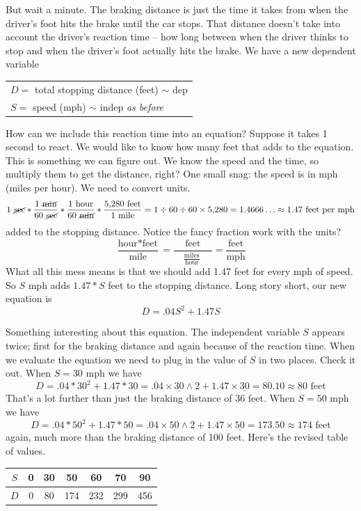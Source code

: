 But wait a minute.  The braking distance is just the time it takes from when the driver's foot hits the brake until the car stops.  That distance doesn't take into account the driver's reaction time -- how long between when the driver thinks to stop and when the driver's foot actually hits the brake.  We have a new dependent variable
\begin{center}
\begin{tabular} {l} 
$D=$ total stopping distance (feet) $\sim$ dep \\ 
$S=$ speed (mph) $\sim$ indep \quad \emph{as before}\\
\end{tabular}
\end{center}

How can we include this reaction time into an equation?  Suppose it takes 1 second to react.  We would like to know how many feet that adds to the equation.  This is something we can figure out.  We know the speed and the time, so multiply them to get the distance, right?  One small snag:  the speed is in mph (miles per hour).  We need to convert units.    
$$1 \text{ \cancel{sec}} \ast \frac{1 \text{ \cancel{min}}}{60 \text{ \cancel{sec}}} \ast \frac{1 \text{ hour}}{60 \text{ \cancel{min}}} \ast \frac{\text{5,280 feet}}{1 \text{ mile}}=1 \div 60 \div 60 \times \text{5,280}= 1.4666\ldots \approx 1.47 \text{ feet per mph}$$
added to the stopping distance. 
Notice the fancy fraction work  with the units?
$$\frac{\text{hour}\ast \text{feet}}{\text{mile}}=\frac{\text{feet}}{\quad \frac{\text{miles}}{\text{hour}}\quad~}=\frac{\text{feet}}{\text{mph}}$$
What all this mess means is that we should add 1.47 feet for every mph of speed.  
So $S$ mph adds $1.47\ast S$ feet to the stopping distance.
 Long story short, our new equation is
 $$D=.04S^2+1.47S$$

Something interesting about this equation. The independent variable $S$ appears twice; first for the braking distance and again because of the reaction time. When we evaluate the equation we need to plug in the value of $S$ in two places.  Check it out.
When $S=30$ mph we have $$D =  .04 \ast  30^2 + 1.47 \ast 30 = .04\times \underline{30} \wedge 2 +1.47 \times \underline{30} = 80.10 \approx 80 \text{ feet}$$ 
That's a lot further than just the braking distance of 36 feet.
When $S=50$ mph we have $$D = .04 \ast  50^2 +1.47\ast 50 =  .04\times \underline{50} \wedge 2 +1.47\times \underline{50} = 173.50 \approx 174 \text{ feet}$$
again, much more than the braking distance of 100 feet.
Here's the revised table of values.
\begin{center}
\begin{tabular} {|c| |c|c |c|c|c |c|} \hline
$S$ & 0 & 30 & 50 & 60 & 70 & 90 \\ \hline
$D$ & 0 & 80 & 174 & 232 & 299 & 456 \\ \hline
\end{tabular}
\end{center}

